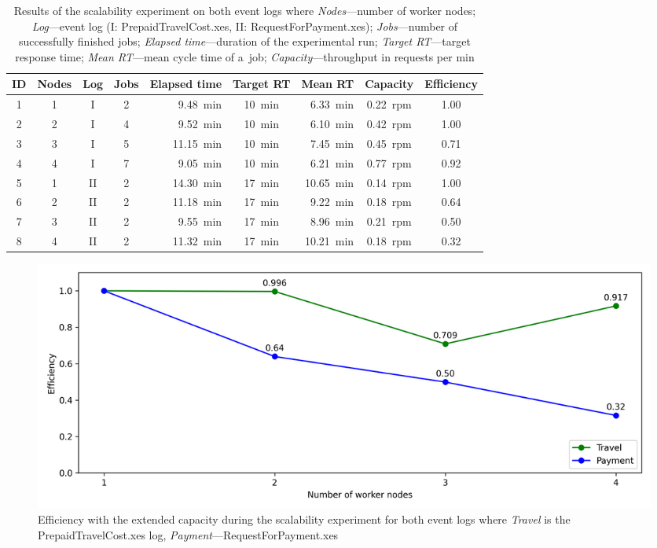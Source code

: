\documentclass[12pt]{article}
\begin{document}
\begin{table}
    \scriptsize
    \centering
    \begin{tabular}{|c|c|c|c|r|c|r|c|c|}
        \hline
        \textbf{ID} & \textbf{Nodes} & \textbf{Log} & \textbf{Jobs} & \textbf{Elapsed time} & \textbf{Target RT} & \textbf{Mean RT} & \textbf{Capacity} & \textbf{Efficiency}  \\
        \hline
        \hline
        1 & 1 & I & 2 & 9.48~min & 10~min & 6.33~min & 0.22~rpm & 1.00 \\
        \hline
        2 & 2 & I & 4 & 9.52~min & 10~min & 6.10~min & 0.42~rpm & 1.00 \\
        \hline
        3 & 3 & I & 5 & 11.15~min & 10~min & 7.45~min & 0.45~rpm & 0.71 \\
        \hline
        4 & 4 & I & 7 & 9.05~min & 10~min & 6.21~min & 0.77~rpm & 0.92 \\
        \hline
        \hline
        5 & 1 & II & 2 & 14.30~min & 17~min & 10.65~min & 0.14~rpm & 1.00 \\
        \hline
        6 & 2 & II & 2 & 11.18~min & 17~min & 9.22~min & 0.18~rpm & 0.64 \\
        \hline
        7 & 3 & II & 2 & 9.55~min & 17~min & 8.96~min & 0.21~rpm & 0.50 \\
        \hline
        8 & 4 & II & 2 & 11.32~min & 17~min & 10.21~min & 0.18~rpm & 0.32 \\
        \hline
    \end{tabular}
    \caption{Results of the scalability experiment on both event logs where \emph{Nodes}---number of worker nodes; \emph{Log}---event log (I: PrepaidTravelCost.xes, II: RequestForPayment.xes); \emph{Jobs}---number of successfully finished jobs; \emph{Elapsed time}---duration of the experimental run; \emph{Target RT}---target response time; \emph{Mean RT}---mean cycle time of a~job; \emph{Capacity}---throughput in requests per min}
    \label{tab:scalability_results}
\end{table}

\begin{figure}
    \centering
    \includegraphics[width=\textwidth]{figures/scalability_experiment.png}
    \caption{Efficiency with the extended capacity during the scalability experiment for both event logs where \emph{Travel} is the PrepaidTravelCost.xes log, \emph{Payment}---RequestForPayment.xes}
    \label{fig:scalability_experiment}
\end{figure}
\end{document}
